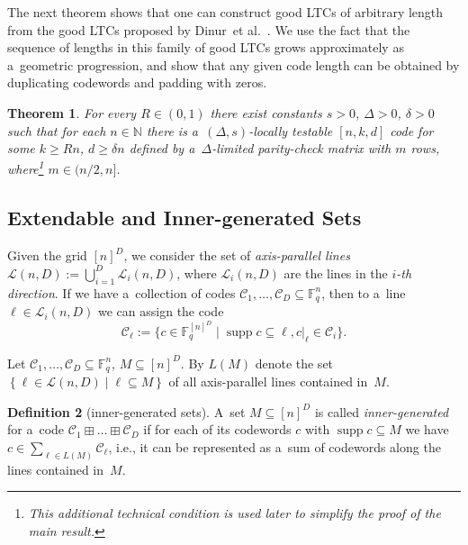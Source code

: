 \documentclass[conference]{IEEEtran}
\newcommand{\fbr}[1]{\left\{#1\right\}}
\let\ge\geqslant
\theoremstyle{plain}
\newtheorem{theorem}{Theorem}
\theoremstyle{definition}
\newtheorem{definition}[theorem]{Definition}
\theoremstyle{remark}
\newcommand{\NN}{\mathbb{N}}
\newcommand{\cC}{\mathcal{C}}
\newcommand{\cL}{\mathcal{L}}
\newcommand{\F}{\mathbb{F}}
\DeclareMathOperator{\supp}{supp}
\begin{document}
The next theorem shows that one can construct good LTCs of arbitrary length from the good LTCs proposed by Dinur~et al.~\cite{Dinur:stoc2022}. We use the fact that the sequence of lengths in this family of good LTCs grows approximately as a~geometric progression, and show that any given code length can be obtained by duplicating codewords and padding with zeros.

\begin{theorem}\label{th:LTC}
    For every  $R\in (0,1)$ there exist constants $s>0$, $\Delta>0$, $\delta>0$ such that for each $n\in \NN$ there is  a~$(\Delta,s)$-locally testable $[n,k,d]$ code for some ${k\ge Rn}$, ${d\ge\delta n}$ defined by a~$\Delta$-limited parity-check matrix with $m$ rows, where\footnote{This additional technical condition is used later to simplify the proof of the main result.} $m\in (n/2,n]$.
\end{theorem}



\subsection{Extendable and Inner-generated Sets}\label{sec:ext-sets}


Given the grid $[n]^D$, we consider the set of \emph{axis-parallel lines} $\mathcal{L}(n,D):=\bigcup_{i=1}^D\mathcal{L}_i(n,D)$, where $\mathcal{L}_i(n,D)$ are the lines in the \emph{$i$-th direction}. If we have a~collection of codes $\cC_1,\dots, \cC_D\subseteq \F_q^n$, then to a~line $\ell\in\cL_i(n,D)$ we can assign the code 
\[
\cC_\ell:= \{c\in \F_q^{[n]^D} \mid  \supp c \subseteq \ell, c|_\ell\in \cC_i\}.
\]


Let $\cC_1,\dots,\cC_D\subseteq \F_q^n$, $M\subseteq [n]^D$. By $L(M)$ denote the set $\fbr{\ell\in\cL(n,D)\mid \ell\subseteq M}$ of all axis-parallel lines contained in~$M$. 
\begin{definition}[inner-generated sets]
A~set $M \subseteq [n]^D$ is called \emph{inner-generated} for a~code $\cC_1\boxplus\ldots\boxplus \cC_D$ if for each of its codewords $c$ with  $\supp c \subseteq M$ we have $c\in \sum_{\ell\in L(M)}{\cC_\ell}$, i.e., it can be represented as a~sum of codewords along the lines contained in~$M$.    
\end{definition}
\end{document}
